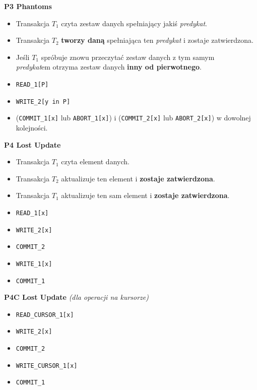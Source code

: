 \textbf{P3 Phantoms}
\begin{itemize}
    \item Transakcja $T_1$ czyta zestaw danych spełniający jakiś
    \textit{predykat}.
    \item Transakcja $T_2$ \textbf{tworzy daną} spełniająca ten
    \textit{predykat} i zostaje zatwierdzona.
    \item Jeśli $T_1$ spróbuje znowu przeczytać zestaw danych z tym samym\\
    \textit{predykat}em otrzyma zestaw danych
    \textbf{inny od pierwotnego}.
    \item \texttt{READ\_1[P]}
    \item \texttt{WRITE\_2[y in P]}
    \item (\texttt{COMMIT\_1[x]} lub \texttt{ABORT\_1[x]}) i
    (\texttt{COMMIT\_2[x]} lub \texttt{ABORT\_2[x]})
    w dowolnej kolejności.
\end{itemize}

\textbf{P4 Lost Update}
\begin{itemize}
    \item Transakcja $T_1$ czyta element danych.
    \item Transakcja $T_2$ aktualizuje ten element i
    \textbf{zostaje zatwierdzona}.
    \item Transakcja $T_1$ aktualizuje ten sam element i
    \textbf{zostaje zatwierdzona}.
    \item \texttt{READ\_1[x]}
    \item \texttt{WRITE\_2[x]}
    \item \texttt{COMMIT\_2}
    \item \texttt{WRITE\_1[x]}
    \item \texttt{COMMIT\_1}
\end{itemize}

\textbf{P4C Lost Update} \textit{(dla operacji na kursorze)}
\begin{itemize}
    \item \texttt{READ\_CURSOR\_1[x]}
    \item \texttt{WRITE\_2[x]}
    \item \texttt{COMMIT\_2}
    \item \texttt{WRITE\_CURSOR\_1[x]}
    \item \texttt{COMMIT\_1}
\end{itemize}

